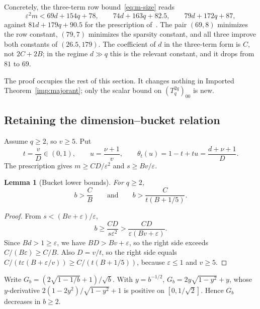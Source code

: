 \documentclass[11pt,a4paper]{article}
\newtheorem{lemma}[theorem]{Lemma}
\theoremstyle{definition}
\theoremstyle{remark}
\newcommand{\eps}{\varepsilon}
\newcommand{\1}{\mathbf 1}
\begin{document}
Concretely, the three-term row bound~\eqref{eq:m-size} reads
\[
 \eps^2m<69d+154q+78,\qquad 74d+163q+82.5,\qquad 79d+172q+87,
\]
against $81d+179q+90.5$ for the prescription of~\cite{SS}. The pair
$(69,8)$ minimizes the row constant, $(79,7)$ minimizes the sparsity
constant, and all three improve both constants of $(26.5,179)$. The coefficient of $d$ in the
three-term form is $C$, not $2C+2B$; in the regime $d\gg q$ this is the
relevant constant, and it drops from $81$ to $69$.

The proof occupies the rest of this section. It changes nothing in
Imported Theorem~\ref{imp:majorant}; only the scalar bound on
$(T_q^{2q})_{00}$ is new.

\subsection{Retaining the dimension--bucket relation}\label{sec:retain}
Assume $q\ge2$, so $v\ge5$. Put
\[
 t=\frac vD\in(0,1),\qquad u=\frac{\nu+1}{v},\qquad
 \theta_t(u)=1-t+tu=\frac{d+\nu+1}{D}.
\]
The prescription gives $m\ge CD/\eps^2$ and $s\ge Bv/\eps$.

\begin{lemma}[Bucket lower bounds]\label{lem:bucket}
For $q\ge2$,
\begin{equation}\label{eq:bucket}
 b>\frac CB\qquad\text{and}\qquad b>\frac{C}{t(B+1/5)}.
\end{equation}
\end{lemma}
\begin{proof}
From $s<(Bv+\eps)/\eps$,
\[
 b\ge\frac{CD}{s\eps^2}>\frac{CD}{\eps(Bv+\eps)}.
\]
Since $Bd>1\ge\eps$, we have $BD>Bv+\eps$, so the right side exceeds
$C/(B\eps)\ge C/B$. Also $D=v/t$, so the right side equals
$C/(t\eps(B+\eps/v))\ge C/(t(B+1/5))$, because $\eps\le1$ and $v\ge5$.
\end{proof}

Write $G_b=(2\sqrt{1-1/b}+1)/\sqrt b$. With $y=b^{-1/2}$,
$G_b=2y\sqrt{1-y^2}+y$, whose $y$-derivative
$2(1-2y^2)/\sqrt{1-y^2}+1$ is positive on $[0,1/\sqrt2]$. Hence $G_b$
decreases in $b\ge2$.
\end{document}
